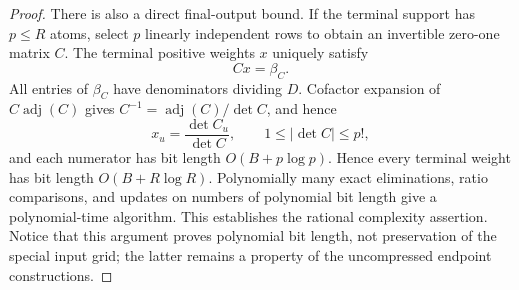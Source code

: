 \documentclass{article}
\begin{document}
\begin{proof}
There is also a direct final-output bound. If the terminal support has \(p\leq R\) atoms, select \(p\) linearly independent rows to obtain an invertible zero-one matrix \(C\). The terminal positive weights \(x\) uniquely satisfy
\[
 Cx=\beta_C.
\]
All entries of \(\beta_C\) have denominators dividing \(D\). Cofactor expansion of \(C\operatorname{adj}(C)\) gives \(C^{-1}=\operatorname{adj}(C)/\det C\), and hence
\[
 x_u=\frac{\det C_u}{\det C},
 \qquad 1\leq |\det C|\leq p!,
\]
and each numerator has bit length \(O(B+p\log p)\). Hence every terminal weight has bit length \(O(B+R\log R)\). Polynomially many exact eliminations, ratio comparisons, and updates on numbers of polynomial bit length give a polynomial-time algorithm. This establishes the rational complexity assertion. Notice that this argument proves polynomial bit length, not preservation of the special input grid; the latter remains a property of the uncompressed endpoint constructions.
\end{proof}
\end{document}
